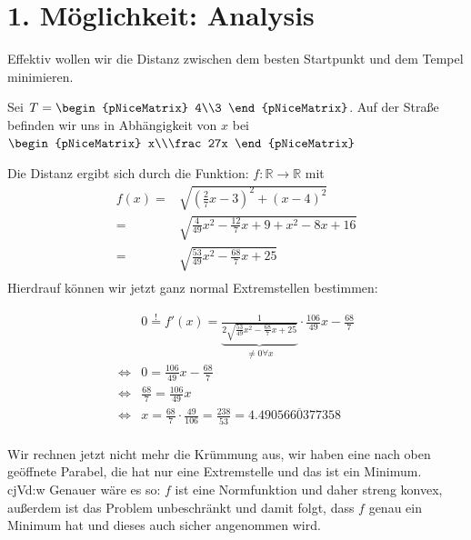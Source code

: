 \documentclass{article}
\begin{document}

\section*{1. Möglichkeit: Analysis}
Effektiv wollen wir die Distanz zwischen dem besten Startpunkt und dem Tempel minimieren.

Sei $T=
\begin{pNiceMatrix}
    4\\3
\end{pNiceMatrix}
$. 
Auf der Straße befinden wir uns in Abhängigkeit von $x$ bei 
$
\begin{pNiceMatrix}
    x\\\frac 27x
\end{pNiceMatrix}
$

Die Distanz ergibt sich durch die Funktion: $f:\mathbb{R}\to\mathbb{R}$ mit
\begin{align*}
    f(x)=&\sqrt{\left(\frac 27x - 3\right)^2+(x-4)^2}\\
    =&\sqrt{\frac4{49}x^2-\frac{12}7x+9+x^2-8x+16}\\
    =&\sqrt{\frac{53}{49}x^2-\frac{68}7x+25}\\
\end{align*}
Hierdrauf können wir jetzt ganz normal Extremstellen bestimmen:

\begin{align*}
    &0\stackrel!=f'(x)=\underbrace{\frac{1}{2\sqrt{\frac{53}{49}x^2-\frac{68}7x+25}}}_{\not = 0 \forall x}
    \cdot \frac{106}{49}x-\frac{68}7\\
    \Longleftrightarrow &0=\frac{106}{49}x-\frac{68}7\\
    \Longleftrightarrow &\frac{68}7=\frac{106}{49}x\\
    \Longleftrightarrow &x=\frac{68}7\cdot\frac{49}{106}=\frac{238}{53}=4.\overline{4905660377358}\\
\end{align*}

Wir rechnen jetzt nicht mehr die Krümmung aus, wir haben eine nach oben geöffnete Parabel, die hat
nur eine Extremstelle und das ist ein Minimum. \\cjVd:w
Genauer wäre es so: $f$ ist eine Normfunktion und daher 
streng konvex, außerdem ist das Problem unbeschränkt und damit folgt, dass $f$ genau 
ein Minimum hat und dieses auch sicher angenommen wird.

\newpage
\end{document}
